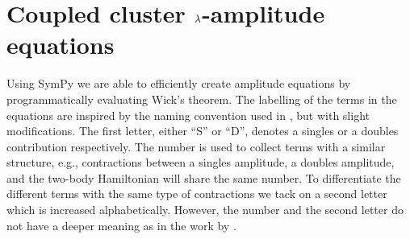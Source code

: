     \section{Coupled cluster $\lambda$-amplitude equations}
        \label{app:cc-lambda-amplitudes}
        Using SymPy \cite{sympy} we are able to efficiently create amplitude
        equations by programmatically evaluating Wick's theorem.
        The labelling of the terms in the equations are inspired by the naming
        convention used in  \cite{shavitt2009many},
        but with slight modifications.
        The first letter, either ``S'' or ``D'', denotes a singles or a doubles
        contribution respectively.
        The number is used to collect terms with a similar structure, e.g.,
        contractions between a singles amplitude, a doubles amplitude, and the
        two-body Hamiltonian will share the same number.
        To differentiate the different terms with the same type of contractions
        we tack on a second letter which is increased alphabetically.
        However, the number and the second letter do not have a deeper meaning
        as in the work by \citeauthor{shavitt2009many} \cite{shavitt2009many}.

